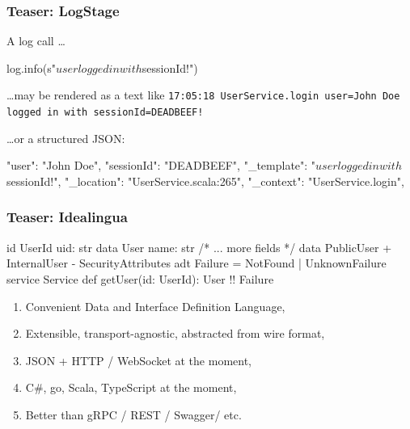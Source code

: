 \documentclass[usenames,dvipsnames]{beamer}
\begin{document}
\begin{frame}[fragile]
  \frametitle{Teaser: LogStage}
  A log call \dots
  \begin{scalacode}
log.info(s"$user logged in with $sessionId!")
  \end{scalacode}

  \dots may be rendered as a text like \texttt{17:05:18 UserService.login user=John Doe logged in with sessionId=DEADBEEF!}

  \dots or a structured JSON:
  \begin{jsoncode}
{
  "user": "John Doe",
  "sessionId": "DEADBEEF",
  "_template": "$user logged in with $sessionId!",
  "_location": "UserService.scala:265",
  "_context": "UserService.login",
}
  \end{jsoncode}
\end{frame}

\begin{frame}[fragile]
  \frametitle{Teaser: Idealingua}
  \begin{textcode}
id UserId { uid: str }
data User {  name: str /* ... more fields */ }
data PublicUser {
 + InternalUser
 - SecurityAttributes
}
adt Failure = NotFound | UnknownFailure
service Service {
  def getUser(id: UserId): User !! Failure
}
  \end{textcode}

\begin{enumerate}
\item Convenient Data and Interface Definition Language,
\item Extensible, transport-agnostic, abstracted from wire format,
\item JSON + HTTP / WebSocket at the moment,
\item C\#, go, Scala, TypeScript at the moment,
\item Better than gRPC / REST / Swagger/ etc.
\end{enumerate}
\end{frame}
\end{document}

